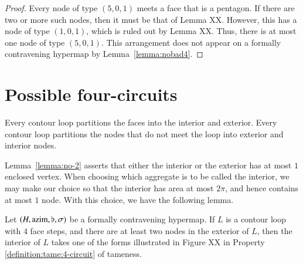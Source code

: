 \begin{proof} Every node of type $(5,0,1)$ meets a face that is a pentagon.
If there are two or more such nodes, then it must be that of Lemma
XX.  However, this has a node of type $(1,0,1)$, which is ruled out
by Lemma XX.  Thus, there is at most one node of type $(5,0,1)$.
This arrangement does not appear on a formally contravening hypermap
by Lemma~\ref{lemma:nobad4}.
\end{proof}



\section{Possible four-circuits}

Every contour loop partitions the faces into the interior and
exterior.  Every contour loop partitions the nodes that do not meet
the loop into exterior and interior nodes.
%

Lemma~\ref{lemma:no-2} asserts that either the interior or the
exterior has at most $1$ enclosed vertex.   When choosing which
aggregate is to be called the interior, we may make our choice so
that the interior has area at most $2\pi$, and hence contains at
most $1$ node. With this choice, we have the following lemma.

\begin{lemma}
Let $(H,{\operatorname{azim}},\flat,\sigma)$ be a formally contravening hypermap. If
$L$ is a contour loop with $4$ face steps, and there are at least
two nodes in the exterior of $L$, then the interior of $L$ takes one
of the forms illustrated in Figure XX in Property
    \ref{definition:tame:4-circuit} of tameness.
\end{lemma}

